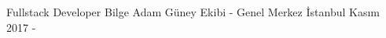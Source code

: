\begin{cventries}
{\begin{cvitems}
    \cventry
        {Fullstack Developer}
        {Bilge Adam Güney Ekibi - Genel Merkez}
        {İstanbul}
        {Kasım 2017 - }
        {
        \begin{cvitems}
            \item{}
        \end{cvitems}
        }
        
            \end{cvitems}
        }
\end{cventries}
